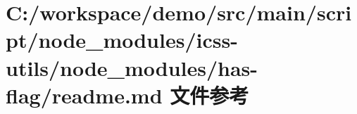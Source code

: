\hypertarget{node__modules_2icss-utils_2node__modules_2has-flag_2_r_e_a_d_m_e_8md}{}\section{C\+:/workspace/demo/src/main/script/node\+\_\+modules/icss-\/utils/node\+\_\+modules/has-\/flag/readme.md 文件参考}
\label{node__modules_2icss-utils_2node__modules_2has-flag_2_r_e_a_d_m_e_8md}
